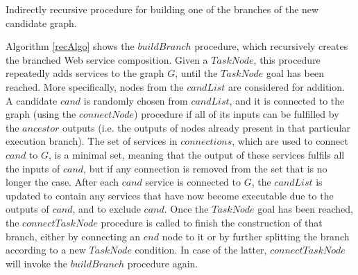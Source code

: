 \begin{algorithm}
 \setlength{}
  
 \LinesNumbered
 \SetNlSty{}{}{:}

 \caption{\footnotesize Indirectly recursive procedure for building one of the branches of the new candidate graph.}
\label{recAlgo}
\end{algorithm}

Algorithm \ref{recAlgo} shows the $buildBranch$ procedure, which recursively creates the bran\-ched Web service composition. Given a $TaskNode$, this procedure repeatedly adds 
services to the graph $G$, until the $TaskNode$ goal has been reached. More specifically, nodes from the $candList$ are considered for addition. A candidate $cand$ is randomly chosen from $candList$, and it is connected to the graph (using the $connectNode$) procedure if all of its inputs can be fulfilled by the $ancestor$ outputs (i.e. the outputs of nodes already present in that particular execution branch). The set of services in $connections$, which are used to connect $cand$ to $G$, is a minimal set, meaning that the output of these services fulfils all the inputs of $cand$, but if any connection is removed from the set that is no longer the case. After each $cand$ service is connected to $G$, the $candList$ is updated to contain any services that have now become executable due to the outputs of $cand$, and to exclude $cand$. Once the $TaskNode$ goal has been reached, the $connectTaskNode$ procedure is called to finish the construction of that branch, either by connecting an $end$ node to it or by further splitting the branch according to a new $TaskNode$ condition. In case of the latter, $connectTaskNode$ will invoke the $buildBranch$ procedure again.

